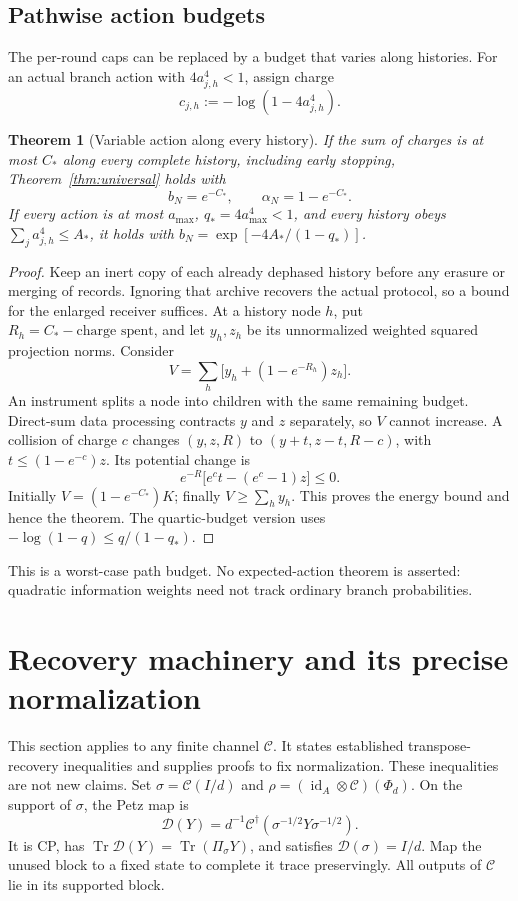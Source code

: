 \documentclass[11pt]{article}
\numberwithin{equation}{section}
\newtheorem{theorem}{Theorem}[section]
\theoremstyle{remark}
\newcommand{\Tr}{\operatorname{Tr}}
\newcommand{\id}{\operatorname{id}}
\newcommand{\Ccal}{\mathcal C}
\newcommand{\Dcal}{\mathcal D}
\begin{document}
\subsection{Pathwise action budgets}
\label{sec:pathwise}
The per-round caps can be replaced by a budget that varies along histories.
For an actual branch action with \(4a_{j,h}^4<1\), assign charge
\begin{equation}
 c_{j,h}:=-\log(1-4a_{j,h}^4).
\end{equation}
\begin{theorem}[Variable action along every history]
\label{thm:pathwise}
If the sum of charges is at most \(C_*\) along \emph{every complete history},
including early stopping, Theorem~\ref{thm:universal} holds with
\begin{equation}
 b_N=e^{-C_*},\qquad\alpha_N=1-e^{-C_*}.
 \label{eq:pathwise}
\end{equation}
If every action is at most \(a_{\max}\), \(q_*=4a_{\max}^4<1\), and every
history obeys \(\sum_j a_{j,h}^4\le A_*\), it holds with
\(b_N=\exp[-4A_* /(1-q_*)]\).
\end{theorem}
\begin{proof}
Keep an inert copy of each already dephased history before any erasure or
merging of records. Ignoring that archive recovers the actual protocol, so
a bound for the enlarged receiver suffices. At a history node \(h\), put
\(R_h=C_*-\text{charge spent}\), and let \(y_h,z_h\) be its unnormalized
weighted squared projection norms. Consider
\[
 V=\sum_h\bigl[y_h+(1-e^{-R_h})z_h\bigr].
\]
An instrument splits a node into children with the same remaining budget.
Direct-sum data processing contracts \(y\) and \(z\) separately, so \(V\)
cannot increase. A collision of charge \(c\) changes
\((y,z,R)\) to \((y+t,z-t,R-c)\), with
\(t\le(1-e^{-c})z\). Its potential change is
\[
 e^{-R}\bigl[e^ct-(e^c-1)z\bigr]\le0.
\]
Initially \(V=(1-e^{-C_*})K\); finally \(V\ge\sum_h y_h\).
This proves the energy bound and hence the theorem. The quartic-budget
version uses \(-\log(1-q)\le q/(1-q_*)\).
\end{proof}
This is a worst-case path budget. No expected-action theorem is asserted:
quadratic information weights need not track ordinary branch probabilities.

\section{Recovery machinery and its precise normalization}
\label{sec:petz}
This section applies to any finite channel \(\Ccal\). It states established
transpose-recovery inequalities \cite{BarnumKnill,Renes} and supplies proofs
to fix normalization. These inequalities are not new claims.
Set \(\sigma=\Ccal(I/d)\) and
\(\rho=(\id_A\otimes\Ccal)(\Phi_d)\).
On the support of \(\sigma\), the Petz map is
\begin{equation}
 \Dcal(Y)=d^{-1}\Ccal^\dagger(\sigma^{-1/2}Y\sigma^{-1/2}).
 \label{eq:petz}
\end{equation}
It is CP, has \(\Tr\Dcal(Y)=\Tr(\Pi_\sigma Y)\), and satisfies
\(\Dcal(\sigma)=I/d\). Map the unused block to a fixed state to complete it
trace preservingly. All outputs of \(\Ccal\) lie in its supported block.
\end{document}
